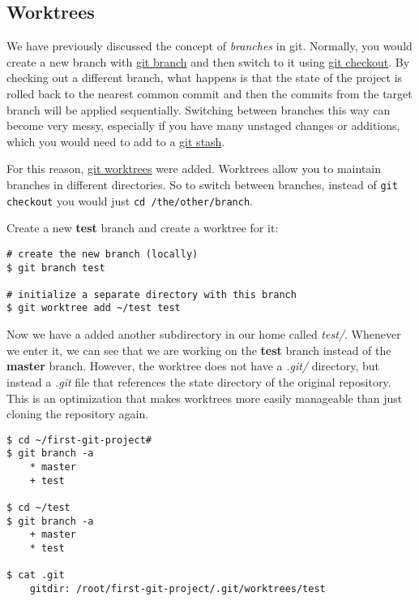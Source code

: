 \subsection{Worktrees}

We have previously discussed the concept of \textit{branches} in git. Normally,
you would create a new branch with \href{https://man.archlinux.org/man/git-branch.1}
{git branch} and then switch to it using \href{https://man.archlinux.org/man/git-checkout.1}
{git checkout}. By checking out a different branch, what happens is that the
state of the project is rolled back to the nearest common commit and then the
commits from the target branch will be applied sequentially. Switching between
branches this way can become very messy, especially if you have many unstaged
changes or additions, which you would need to add to a
\href{https://man.archlinux.org/man/git-stash.1}{git stash}.

For this reason, \href{https://man.archlinux.org/man/git-worktree.1}{git
worktrees} were added. Worktrees allow you to maintain branches in different
directories. So to switch between branches, instead of \texttt{git checkout}
you would just \texttt{cd /the/other/branch}.

Create a new \textbf{test} branch and create a worktree for it:

\begin{lstlisting}[style=bashstyle]
# create the new branch (locally)
$ git branch test

# initialize a separate directory with this branch
$ git worktree add ~/test test
\end{lstlisting}

Now we have a added another subdirectory in our home called \textit{test/}.
Whenever we enter it, we can see that we are working on the \textbf{test} branch
instead of the \textbf{master} branch. However, the worktree does not have a
\textit{.git/} directory, but instead a \textit{.git} file that references the
state directory of the original repository. This is an optimization that makes
worktrees more easily manageable than just cloning the repository again.

\begin{lstlisting}[style=bashstyle]
$ cd ~/first-git-project#
$ git branch -a
    * master
    + test

$ cd ~/test
$ git branch -a
    + master
    * test

$ cat .git
    gitdir: /root/first-git-project/.git/worktrees/test
\end{lstlisting}


